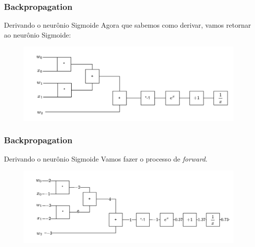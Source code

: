 \documentclass{beamer}
\begin{document}
\begin{frame}
	\frametitle{Backpropagation}
	\begin{block}{Derivando o neurônio Sigmoide}
		Agora que sabemos como derivar, vamos retornar ao neurônio Sigmoide:
		\begin{figure}
			\centering
			\includegraphics[width=1\linewidth]{figures/sigmoidneuron_derivative}
		\end{figure}
	\end{block}
\end{frame}
\begin{frame}
	\frametitle{Backpropagation}
	\begin{block}{Derivando o neurônio Sigmoide}
		Vamos fazer o processo de \textit{forward}.
		\begin{figure}
			\centering
			\includegraphics[width=1\linewidth]{figures/sigmoid_example}
		\end{figure}
	\end{block}
\end{frame}
\end{document}
